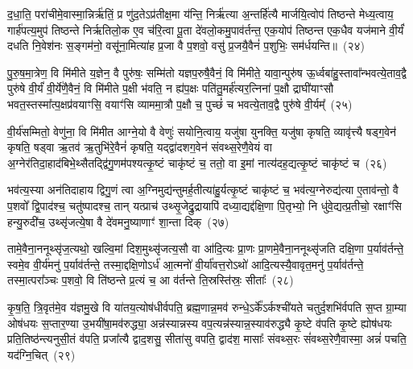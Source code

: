 द॒धा॒ति॒ परा॑चीमे॒वास्मा॒न्निर्\mbox{}ऋ॑तिं॒ प्र णु॑द॒ते\-ऽप्र॑तीक्ष॒मा य॑न्ति॒ निर्\mbox{}ऋ॑त्या अ॒न्तर्\mbox{}हि॑त्यै मार्जयि॒त्वोप॑ तिष्ठन्ते मेध्य॒त्वाय॒ गार्\mbox{}ह॑पत्य॒मुप॑ तिष्ठन्ते निर्\mbox{}ऋतिलो॒क ए॒व च॑रि॒त्वा पू॒ता दे॑वलो॒कमु॒पाव॑र्तन्त॒ एक॒योप॑ तिष्ठन्त एक॒धैव यज॑माने वी॒र्यं॑ दधति नि॒वेश॑नः स॒ङ्गम॑नो॒ वसू॑ना॒मित्या॑ह प्र॒जा वै प॒शवो॒ वसु॑ प्र॒जयै॒वैनं॑ प॒शुभिः॒ सम॑र्धयन्ति॥~(२४)

{\anuvakamend[{ऋ॒तुभि॑रे॒षा परा॑ची॒रुपा॒ष्टाच॑त्वारिꣳशच्च}]}%

पु॒रु॒ष॒मा॒त्रेण॒ वि मि॑मीते य॒ज्ञेन॒ वै पुरु॑षः॒ सम्मि॑तो यज्ञप॒रुषै॒वैनं॒ वि मि॑मीते॒ यावा॒न्पुरु॑ष ऊ॒र्ध्वबा॑हु॒स्तावा᳚न्भव\-त्ये॒ताव॒द्वै पुरु॑षे वी॒र्यं॑ वी॒र्ये॑णै॒वैनं॒ वि मि॑मीते प॒क्षी भ॑वति॒ न ह्य॑प॒क्षः पति॑तु॒मर्\mbox{}ह॑त्यर॒त्निना॑ प॒क्षौ द्राघी॑याꣳसौ भवत॒स्तस्मा᳚त्प॒क्षप्र॑वयाꣳसि॒ वयाꣳ॑सि व्याममा॒त्रौ प॒क्षौ च॒ पुच्छं॑ च भवत्ये॒ताव॒द्वै पुरु॑षे वी॒र्यम्᳚~(२५)

वी॒र्य॑सम्मितो॒ वेणु॑ना॒ वि मि॑मीत आग्ने॒यो वै वेणुः॑ सयोनि॒त्वाय॒ यजु॑षा युनक्ति॒ यजु॑षा कृषति॒ व्यावृ॑त्त्यै षड्ग॒वेन॑ कृषति॒ षड्वा ऋ॒तव॑ ऋ॒तुभि॑रे॒वैनं॑ कृषति॒ यद्द्वा॑दशग॒वेन॑ संवथ्स॒रेणै॒वेयं वा अ॒ग्नेर॑तिदा॒हाद॑बिभे॒थ्सैतद्द्वि॑गु॒णम॑पश्यत्कृ॒ष्टं चाकृ॑ष्टं च॒ ततो॒ वा इ॒मां नात्य॑दह॒द्यत्कृ॒ष्टं चाकृ॑ष्टं च~(२६)

भव॑त्य॒स्या अन॑तिदाहाय द्विगु॒णं त्वा अ॒ग्निमुद्य॑न्तुमर्\mbox{}ह॒तीत्या॑हु॒र्यत्कृ॒ष्टं चाकृ॑ष्टं च॒ भव॑त्य॒ग्नेरुद्य॑त्या ए॒ताव॑न्तो॒ वै प॒शवो᳚ द्वि॒पाद॑श्च॒ चतु॑ष्पादश्च॒ तान् यत्प्राच॑ उथ्सृ॒जेद्रु॒द्रायापि॑ दध्या॒द्यद्द॑क्षि॒णा पि॒तृभ्यो॒ नि धु॑वे॒द्यत्प्र॒तीचो॒ रक्षाꣳ॑सि हन्यु॒रुदी॑च॒ उथ्सृ॑जत्ये॒षा वै दे॑वमनु॒ष्याणाꣳ॑ शा॒न्ता दिक्~(२७)

तामे॒वैना॒ननूथ्सृ॑ज॒त्यथो॒ खल्वि॒मां दिश॒मुथ्सृ॑जत्य॒सौ वा आ॑दि॒त्यः प्रा॒णः प्रा॒णमे॒वैना॒ननूथ्सृ॑जति दक्षि॒णा प॒र्याव॑र्तन्ते॒ स्वमे॒व वी॒र्य॑मनु॑ प॒र्याव॑र्तन्ते॒ तस्मा॒द्दक्षि॒णो\-ऽर्ध॑ आ॒त्मनो॑ वी॒र्या॑वत्त॒रो\-ऽथो॑ आदि॒त्यस्यै॒वावृत॒मनु॑ प॒र्याव॑र्तन्ते॒ तस्मा॒त्परा᳚ञ्चः प॒शवो॒ वि ति॑ष्ठन्ते प्र॒त्यं च॒ आ व॑र्तन्ते ति॒स्रस्ति॑स्रः॒ सीताः᳚~(२८)

कृ॒ष॒ति॒ त्रि॒वृत॑मे॒व य॑ज्ञमु॒खे वि या॑तय॒त्योष॑धीर्वपति॒ ब्रह्म॒णान्न॒मव॑ रुन्धे॒\-ऽर्के᳚\-ऽर्कश्ची॑यते चतुर्द॒शभि॑र्वपति स॒प्त ग्रा॒म्या ओष॑धयः स॒प्तार॒ण्या उ॒भयी॑षा॒मव॑रुद्ध्या॒ अन्न॑स्यान्नस्य वप॒त्यन्न॑स्यान्न॒स्याव॑रुद्ध्यै कृ॒ष्टे व॑पति कृ॒ष्टे ह्योष॑धयः प्रति॒तिष्ठ॑न्त्यनुसी॒तं व॑पति॒ प्रजा᳚त्यै द्वाद॒शसु॒ सीता॑सु वपति॒ द्वाद॑श॒ मासाः᳚ संवथ्स॒रः सं॑वथ्स॒रेणै॒वास्मा॒ अन्नं॑ पचति॒ यद॑ग्नि॒चित्~(२९)

